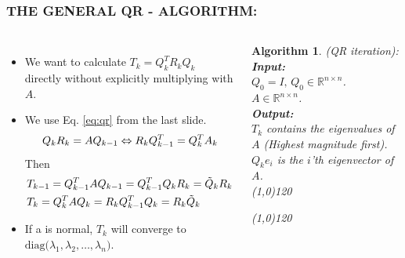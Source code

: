 \documentclass[a4paper,8pt]{beamer} %
\newcommand{\diag}[1]{\text{diag}{#1}}
\newtheorem{algo}{Algorithm}%
\begin{document}
\begin{frame}%
\frametitle{THE GENERAL QR - ALGORITHM:}
\begin{columns}
%
%
\column{7cm}
\begin{itemize}
\item
	We want to calculate $T_k=Q_k^TR_kQ_k$ directly without explicitly multiplying with $A$.
\item 
	We use Eq. \eqref{eq:qr} from the last slide.
\begin{equation}
	Q_kR_k = AQ_{k-1} \Leftrightarrow R_kQ^T_{k-1} = Q_k^TA_k \notag\label{eq824_1} 
\end{equation}
Then
\begin{align}
	&T_{k-1} = Q_{k-1}^T A Q_{k-1}  = Q_{k-1}^T Q_{k} R_{k} = \tilde Q_k R_k\label{eq824_2} \\
	&T_k = Q_k^T A Q_{k}  = R_k Q_{k-1}^T Q_{k} = R_k \tilde Q_k 	\notag\label{eq824_3} 
\end{align}
\item If a is normal, $T_k$ will converge to $\diag(\lambda_1,\lambda_2,\dots,\lambda_n)$.
\end{itemize}	

\column{5cm}
%
%
\begin{algo}
{
%
	(QR iteration):
%
}\\
\textbf{Input: }
{
%
	\\$Q_0=I,\,Q_0\in\mathbb R^{n\times n}$.
	\\$A\in\mathbb R^{n\times n}$.
%
}\\
\textbf{Output: }
{
%
	\\$T_k$ contains the eigenvalues of $A$ (Highest magnitude first). 
	\\$Q_ke_i$ is the $i$'th eigenvector of $A$.
%
}\\
\line(1,0){120}
\begin{algorithmic}
%
\EndFor{}
%
\end{algorithmic}
\line(1,0){120}
\label{algQRIterSimple}
\end{algo}
%
%

\end{columns}
\end{frame} %
\end{document}
